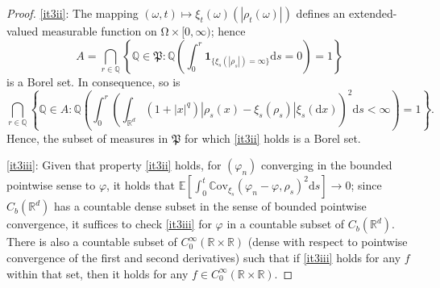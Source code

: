 \documentclass{article}
\theoremstyle{definition}
\numberwithin{equation}{section}
\numberwithin{theorem}{section}
\newcommand{\E}{\mathbb{E}}
\renewcommand{\P}{\mathbb{P}}
\newcommand{\Pp}{\mathbb{Q}}
\newcommand{\R}{\mathbb{R}}
\newcommand{\dx}{\mathrm{d}x}
\newcommand{\ds}{\mathrm{d}s}
\newcommand{\dt}{\mathrm{d}t}
\def\comment#1{\marginpar{\raggedright\scriptsize{\textcolor{red}{#1}}}}
\newcommand{\Cov}{\mathbb{C}\mathrm{ov}}
\newcommand{\Pk}{\mathfrak{P}}
\renewcommand{\P}{{\mathbb P}}
\begin{document}
\begin{appendix}
\begin{proof}
		\ref{it3ii}:
		The mapping $(\omega,t)\mapsto\xi_t(\omega)(|\rho_t(\omega)|)$ defines an extended-valued measurable function on ${\mathrm{\Omega}}\times[0,\infty)$; hence		
		\begin{equation*}
			A=
			\bigcap_{r\in\mathbb{Q}}
			\left\{\Pp\in\Pk:\Pp\left(\int_0^r
			\bm1_{\{\xi_s(|\rho_s|)=\infty\}}
			\ds=0\right)=1\right\}
		\end{equation*}
		is a Borel set. In consequence, so is
		\begin{equation*}
			\bigcap_{r\in\mathbb{Q}}
			\left\{\Pp\in A:\Pp\left(\int_0^r
			\left(\int_{\R^d}(1+|x|^q)\left|\rho_s(x)-\xi_s(\rho_s)\right|\xi_s(\dx)\right)^2
			\ds<\infty\right)=1\right\}.
		\end{equation*}
		Hence, the subset of measures in $\Pk$ for which \ref{it3ii} holds is a Borel set. 
		
		\ref{it3iii}:
		Given that property {\ref{it3ii}} holds, for $(\varphi_n)$
                converging in the bounded pointwise sense to
                $\varphi$, it holds that
                $\E[\int_0^t\Cov_{\xi_s}(\varphi_n-\varphi,\rho_s)^2\ds]\to
                0$; since $C_b({\R^d})$ has a countable dense subset in
                the sense of bounded pointwise convergence, it suffices to check {\ref{it3iii}} for $\varphi$ in a countable subset of $C_b({\R^d})$. There is also a countable subset of $C^\infty_0(\R\times\R)$ (dense with respect to pointwise convergence of the first and second derivatives) such that if {\ref{it3iii}} holds for any $f$ within that set, then it holds for any $f\in C^\infty_0(\R\times\R)$. 
		

\end{proof}
\end{appendix}
\end{document}
